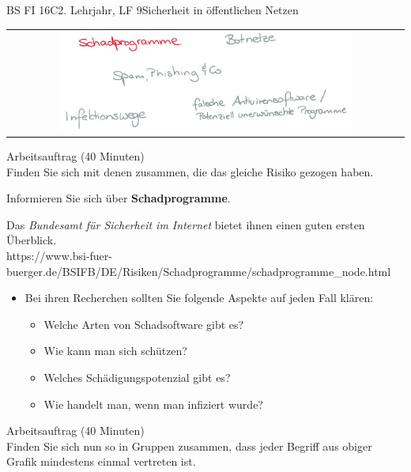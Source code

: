 \documentclass[oneside,openany,headings=optiontotoc,11pt,numbers=noenddot]{scrreprt}
\begin{document}
\begin{worksheet}{BS FI 16C}{2. Lehrjahr, LF 9}{Sicherheit in öffentlichen Netzen}
		\newpage
		\setcounter{page}{1}
		\begin{framed}
			\begin{tabular}{lcr}
				& \includegraphics[width=0.8\textwidth]{Bilder/Schadprogramme.jpg} & \\
			\end{tabular}
		\end{framed}
		\color{codegray}Arbeitsauftrag (40 Minuten)\\
		\color{black}
		Finden Sie sich mit denen zusammen, die das gleiche Risiko gezogen haben.
		\par
		\bigskip
		\noindent
		Informieren Sie sich über \textbf{Schadprogramme}.
		\par\bigskip\noindent
		Das \textit{Bundesamt für Sicherheit im Internet} bietet ihnen einen guten ersten Überblick.\\
		\small{\color{codegray}https://www.bsi-fuer-buerger.de/BSIFB/DE/Risiken/Schadprogramme/schadprogramme\_node.html}
		\normalsize
		\begin{itemize}
			\item[] Bei ihren Recherchen sollten Sie folgende Aspekte auf jeden Fall klären:
			\begin{itemize}
				\item Welche Arten von Schadsoftware gibt es?
				\item Wie kann man sich schützen?
				\item Welches Schädigungspotenzial gibt es?
				\item Wie handelt man, wenn man infiziert wurde?
			\end{itemize}
		\end{itemize}
		\par
		\bigskip
		\noindent
		
		\color{codegray}Arbeitsauftrag (40 Minuten)\\
		\color{black}
		Finden Sie sich nun so in Gruppen zusammen, dass jeder Begriff aus obiger Grafik mindestens einmal vertreten ist.
	

\end{worksheet}
\end{document}
